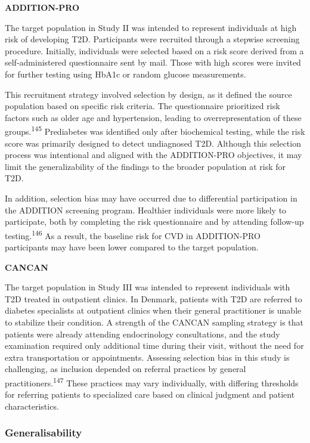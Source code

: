 \documentclass[
  letterpaper,
  headsepline=true,
  open=any]{scrbook}
\begin{document}
\textbf{ADDITION-PRO}

The target population in Study II was intended to represent individuals
at high risk of developing T2D. Participants were recruited through a
stepwise screening procedure. Initially, individuals were selected based
on a risk score derived from a self-administered questionnaire sent by
mail. Those with high scores were invited for further testing using
HbA1c or random glucose measurements.

This recruitment strategy involved selection by design, as it defined
the source population based on specific risk criteria. The questionnaire
prioritized risk factors such as older age and hypertension, leading to
overrepresentation of these groups.\textsuperscript{145} Prediabetes was
identified only after biochemical testing, while the risk score was
primarily designed to detect undiagnosed T2D. Although this selection
process was intentional and aligned with the ADDITION-PRO objectives, it
may limit the generalizability of the findings to the broader population
at risk for T2D.

In addition, selection bias may have occurred due to differential
participation in the ADDITION screening program. Healthier individuals
were more likely to participate, both by completing the risk
questionnaire and by attending follow-up testing.\textsuperscript{146}
As a result, the baseline risk for CVD in ADDITION-PRO participants may
have been lower compared to the target population.

\textbf{CANCAN}

The target population in Study III was intended to represent individuals
with T2D treated in outpatient clinics. In Denmark, patients with T2D
are referred to diabetes specialists at outpatient clinics when their
general practitioner is unable to stabilize their condition. A strength
of the CANCAN sampling strategy is that patients were already attending
endocrinology consultations, and the study examination required only
additional time during their visit, without the need for extra
transportation or appointments. Assessing selection bias in this study
is challenging, as inclusion depended on referral practices by general
practitioners.\textsuperscript{147} These practices may vary
individually, with differing thresholds for referring patients to
specialized care based on clinical judgment and patient characteristics.

\hypertarget{generalisability}{%
\subsubsection{Generalisability}\label{generalisability}}
\end{document}
